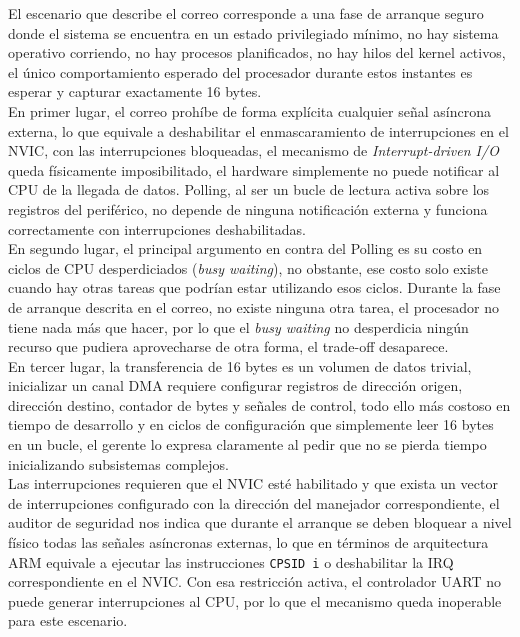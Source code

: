 \documentclass[12pt,letterpaper]{article}
\begin{document}
El escenario que describe el correo corresponde a una fase de arranque seguro donde el sistema se encuentra en un
estado privilegiado mínimo, no hay sistema operativo corriendo, no hay procesos planificados, no hay hilos del
kernel activos, el único comportamiento esperado del procesador durante estos instantes es esperar y capturar
exactamente 16 bytes.\\

En primer lugar, el correo prohíbe de forma explícita cualquier señal asíncrona externa, lo que equivale a
deshabilitar el enmascaramiento de interrupciones en el NVIC, con las interrupciones bloqueadas, el mecanismo de
\textit{Interrupt-driven I/O} queda físicamente imposibilitado, el hardware simplemente no puede notificar al CPU
de la llegada de datos. Polling, al ser un bucle de lectura activa sobre los registros del periférico, no
depende de ninguna notificación externa y funciona correctamente con interrupciones deshabilitadas.\\
En segundo lugar, el principal argumento en contra del Polling es su costo en ciclos de CPU desperdiciados
(\textit{busy waiting}), no obstante, ese costo solo existe cuando hay otras tareas que podrían estar utilizando
esos ciclos. Durante la fase de arranque descrita en el correo, no existe ninguna otra tarea, el procesador no
tiene nada más que hacer, por lo que el \textit{busy waiting} no desperdicia ningún recurso que pudiera
aprovecharse de otra forma, el trade-off desaparece.\\
En tercer lugar, la transferencia de 16 bytes es un volumen de datos trivial, inicializar un canal DMA requiere
configurar registros de dirección origen, dirección destino, contador de bytes y señales de control, todo ello
más costoso en tiempo de desarrollo y en ciclos de configuración que simplemente leer 16 bytes en un bucle, el gerente lo expresa claramente al pedir que no se pierda tiempo inicializando subsistemas complejos.\\

Las interrupciones requieren que el NVIC esté habilitado y que exista un vector de interrupciones configurado con
la dirección del manejador correspondiente, el auditor de seguridad nos indica que durante el arranque se deben
bloquear a nivel físico todas las señales asíncronas externas, lo que en términos de arquitectura ARM equivale a
ejecutar las instrucciones \texttt{CPSID i} o deshabilitar la IRQ correspondiente en el NVIC. Con esa restricción
activa, el controlador UART no puede generar interrupciones al CPU, por lo que el mecanismo queda inoperable para
este escenario.\\
\end{document}
